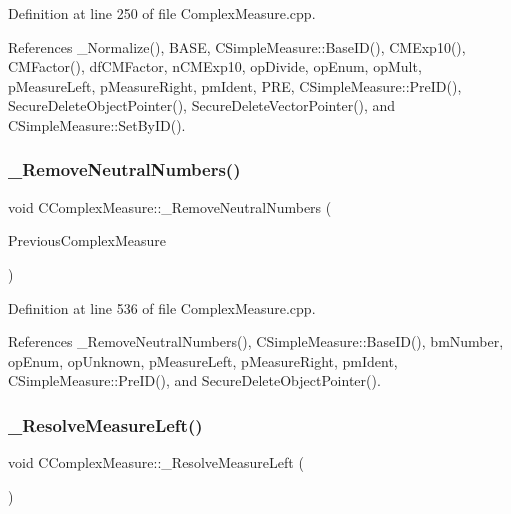 Definition at line 250 of file Complex\+Measure.\+cpp.



References \+\_\+\+Normalize(), B\+A\+SE, C\+Simple\+Measure\+::\+Base\+I\+D(), C\+M\+Exp10(), C\+M\+Factor(), df\+C\+M\+Factor, n\+C\+M\+Exp10, op\+Divide, op\+Enum, op\+Mult, p\+Measure\+Left, p\+Measure\+Right, pm\+Ident, P\+RE, C\+Simple\+Measure\+::\+Pre\+I\+D(), Secure\+Delete\+Object\+Pointer(), Secure\+Delete\+Vector\+Pointer(), and C\+Simple\+Measure\+::\+Set\+By\+I\+D().

\mbox{\label{classCComplexMeasure_a9eb89170847ab2ef592eace6453cf300}} 
\subsubsection{\texorpdfstring{\+\_\+\+Remove\+Neutral\+Numbers()}{\_RemoveNeutralNumbers()}}
{\footnotesize\ttfamily void C\+Complex\+Measure\+::\+\_\+\+Remove\+Neutral\+Numbers (\begin{DoxyParamCaption}\item[{\hyperlink{classCComplexMeasure}{C\+Complex\+Measure} \&}]{Previous\+Complex\+Measure }\end{DoxyParamCaption})\hspace{0.3cm}{\ttfamily [protected]}}



Definition at line 536 of file Complex\+Measure.\+cpp.



References \+\_\+\+Remove\+Neutral\+Numbers(), C\+Simple\+Measure\+::\+Base\+I\+D(), bm\+Number, op\+Enum, op\+Unknown, p\+Measure\+Left, p\+Measure\+Right, pm\+Ident, C\+Simple\+Measure\+::\+Pre\+I\+D(), and Secure\+Delete\+Object\+Pointer().

\mbox{\label{classCComplexMeasure_a8f642a3a0044d4dc0492774bca8666e9}} 
\subsubsection{\texorpdfstring{\+\_\+\+Resolve\+Measure\+Left()}{\_ResolveMeasureLeft()}}
{\footnotesize\ttfamily void C\+Complex\+Measure\+::\+\_\+\+Resolve\+Measure\+Left (\begin{DoxyParamCaption}{ }\end{DoxyParamCaption})\hspace{0.3cm}{\ttfamily [protected]}}



